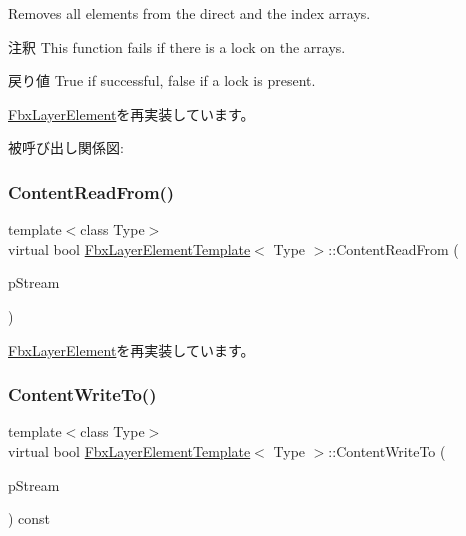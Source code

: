 Removes all elements from the direct and the index arrays. \begin{DoxyRemark}{注釈}
This function fails if there is a lock on the arrays. 
\end{DoxyRemark}
\begin{DoxyReturn}{戻り値}
{\ttfamily True} if successful, {\ttfamily false} if a lock is present. 
\end{DoxyReturn}


\hyperlink{class_fbx_layer_element_a6ab41d0a26802a359efbbc3b2b12dd3d}{Fbx\+Layer\+Element}を再実装しています。

被呼び出し関係図\+:
\mbox{\label{class_fbx_layer_element_template_a19424f43272601bf018b8a0ba843b094}} 
\subsubsection{\texorpdfstring{Content\+Read\+From()}{ContentReadFrom()}}
{\footnotesize\ttfamily template$<$class Type$>$ \\
virtual bool \hyperlink{class_fbx_layer_element_template}{Fbx\+Layer\+Element\+Template}$<$ Type $>$\+::Content\+Read\+From (\begin{DoxyParamCaption}\item[{const \hyperlink{class_fbx_stream}{Fbx\+Stream} \&}]{p\+Stream }\end{DoxyParamCaption})\hspace{0.3cm}{\ttfamily [virtual]}}



\hyperlink{class_fbx_layer_element_a407c679ef12336f2cf916f598053bf02}{Fbx\+Layer\+Element}を再実装しています。

\mbox{\label{class_fbx_layer_element_template_a035bb7adbe8edf5a861d6154c7ebeb8b}} 
\subsubsection{\texorpdfstring{Content\+Write\+To()}{ContentWriteTo()}}
{\footnotesize\ttfamily template$<$class Type$>$ \\
virtual bool \hyperlink{class_fbx_layer_element_template}{Fbx\+Layer\+Element\+Template}$<$ Type $>$\+::Content\+Write\+To (\begin{DoxyParamCaption}\item[{\hyperlink{class_fbx_stream}{Fbx\+Stream} \&}]{p\+Stream }\end{DoxyParamCaption}) const\hspace{0.3cm}{\ttfamily [virtual]}}



